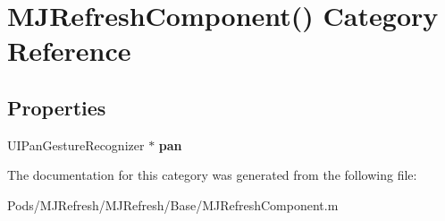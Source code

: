\hypertarget{category_m_j_refresh_component_07_08}{}\section{M\+J\+Refresh\+Component() Category Reference}
\label{category_m_j_refresh_component_07_08}
\subsection*{Properties}
\begin{DoxyCompactItemize}
\item 
\mbox{\label{category_m_j_refresh_component_07_08_a82d92dc3a03c72d34bb8b12966369997}} 
U\+I\+Pan\+Gesture\+Recognizer $\ast$ {\bfseries pan}
\end{DoxyCompactItemize}


The documentation for this category was generated from the following file\+:\begin{DoxyCompactItemize}
\item 
Pods/\+M\+J\+Refresh/\+M\+J\+Refresh/\+Base/M\+J\+Refresh\+Component.\+m\end{DoxyCompactItemize}
